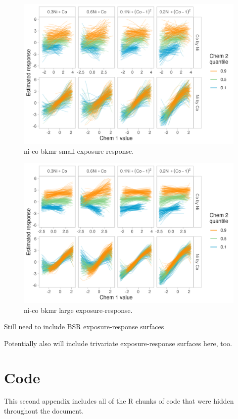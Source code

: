 \documentclass[12pt, twoside]{amherstthesis}
\begin{document}
\begin{figure}

{\centering \includegraphics[width=0.75\linewidth]{figures/ch4_ksm_biv_expresp_3} 

}

\caption{ni-co bkmr small exposure response.}\label{fig:ksmnico}
\end{figure}
\begin{figure}

{\centering \includegraphics[width=0.75\linewidth]{figures/ch4_klg_biv_expresp_3} 

}

\caption{ni-co bkmr large exposure-response.}\label{fig:klgnico}
\end{figure}
Still need to include BSR exposure-response surfaces

Potentially also will include trivariate exposure-response surfaces here, too.

\hypertarget{code}{%
\chapter{Code}\label{code}}

This second appendix includes all of the R chunks of code that were hidden throughout the document.
\end{document}
